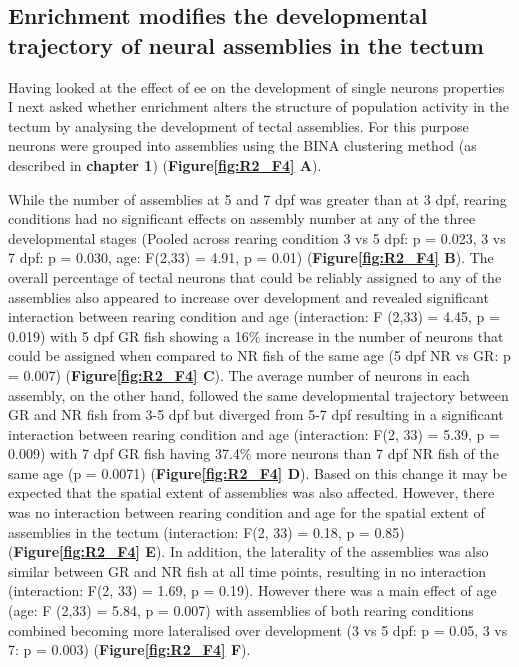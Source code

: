 \subsection{Enrichment modifies the developmental trajectory of neural assemblies in the tectum}
Having looked at the effect of \gls{ee} on the development of single neurons properties I next asked whether enrichment alters the structure of population activity in the tectum by analysing the development of tectal assemblies. For this purpose neurons were grouped into assemblies using the BINA clustering method (as described in \textbf{chapter 1}) (\textbf{Figure\ref{fig:R2_F4} A}). 

While the number of assemblies at 5 and 7 dpf was greater than at 3 dpf, rearing conditions had no significant effects on assembly number at any of the three developmental stages (Pooled across rearing condition 3 vs 5 \gls{dpf}: p = 0.023, 3 vs 7 \gls{dpf}: p = 0.030, age: F(2,33) = 4.91, p = 0.01) (\textbf{Figure\ref{fig:R2_F4} B}). The overall percentage of tectal neurons that could be reliably assigned to any of the assemblies  also appeared to increase over development and revealed significant interaction between rearing condition and age (interaction: F (2,33) = 4.45, p = 0.019) with 5 \gls{dpf} GR fish showing a 16\% increase in the number of neurons that could be assigned when compared to NR fish of the same age (5 \gls{dpf} NR vs GR: p = 0.007) (\textbf{Figure\ref{fig:R2_F4} C}). The average number of neurons in each assembly, on the other hand,  followed the same developmental trajectory between GR and NR fish from 3-5 \gls{dpf} but diverged from 5-7 \gls{dpf} resulting in a significant interaction between rearing condition and age (interaction: F(2, 33) =  5.39, p = 0.009) with 7 \gls{dpf} GR fish having 37.4\% more neurons than 7 \gls{dpf} NR fish of the same age (p = 0.0071) (\textbf{Figure\ref{fig:R2_F4} D}). Based on this change it may be expected that the spatial extent of assemblies was also affected. However, there was no interaction between rearing condition and age for the spatial extent of assemblies in the tectum (interaction: F(2, 33) =  0.18, p =  0.85) (\textbf{Figure\ref{fig:R2_F4} E}). In addition, the laterality of the assemblies was also similar between GR and NR fish at all time points, resulting in no interaction (interaction: F(2, 33) =  1.69, p =  0.19). However there was a main effect of age (age: F (2,33) = 5.84, p = 0.007) with assemblies of both rearing conditions combined becoming more lateralised over development (3 vs 5 \gls{dpf}: p = 0.05, 3 vs 7: p = 0.003) (\textbf{Figure\ref{fig:R2_F4} F}). 

